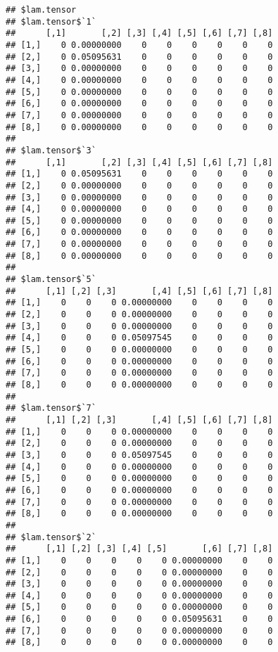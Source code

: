 \documentclass[
]{article}
\begin{document}
\begin{verbatim}
## $lam.tensor
## $lam.tensor$`1`
##      [,1]       [,2] [,3] [,4] [,5] [,6] [,7] [,8]
## [1,]    0 0.00000000    0    0    0    0    0    0
## [2,]    0 0.05095631    0    0    0    0    0    0
## [3,]    0 0.00000000    0    0    0    0    0    0
## [4,]    0 0.00000000    0    0    0    0    0    0
## [5,]    0 0.00000000    0    0    0    0    0    0
## [6,]    0 0.00000000    0    0    0    0    0    0
## [7,]    0 0.00000000    0    0    0    0    0    0
## [8,]    0 0.00000000    0    0    0    0    0    0
## 
## $lam.tensor$`3`
##      [,1]       [,2] [,3] [,4] [,5] [,6] [,7] [,8]
## [1,]    0 0.05095631    0    0    0    0    0    0
## [2,]    0 0.00000000    0    0    0    0    0    0
## [3,]    0 0.00000000    0    0    0    0    0    0
## [4,]    0 0.00000000    0    0    0    0    0    0
## [5,]    0 0.00000000    0    0    0    0    0    0
## [6,]    0 0.00000000    0    0    0    0    0    0
## [7,]    0 0.00000000    0    0    0    0    0    0
## [8,]    0 0.00000000    0    0    0    0    0    0
## 
## $lam.tensor$`5`
##      [,1] [,2] [,3]       [,4] [,5] [,6] [,7] [,8]
## [1,]    0    0    0 0.00000000    0    0    0    0
## [2,]    0    0    0 0.00000000    0    0    0    0
## [3,]    0    0    0 0.00000000    0    0    0    0
## [4,]    0    0    0 0.05097545    0    0    0    0
## [5,]    0    0    0 0.00000000    0    0    0    0
## [6,]    0    0    0 0.00000000    0    0    0    0
## [7,]    0    0    0 0.00000000    0    0    0    0
## [8,]    0    0    0 0.00000000    0    0    0    0
## 
## $lam.tensor$`7`
##      [,1] [,2] [,3]       [,4] [,5] [,6] [,7] [,8]
## [1,]    0    0    0 0.00000000    0    0    0    0
## [2,]    0    0    0 0.00000000    0    0    0    0
## [3,]    0    0    0 0.05097545    0    0    0    0
## [4,]    0    0    0 0.00000000    0    0    0    0
## [5,]    0    0    0 0.00000000    0    0    0    0
## [6,]    0    0    0 0.00000000    0    0    0    0
## [7,]    0    0    0 0.00000000    0    0    0    0
## [8,]    0    0    0 0.00000000    0    0    0    0
## 
## $lam.tensor$`2`
##      [,1] [,2] [,3] [,4] [,5]       [,6] [,7] [,8]
## [1,]    0    0    0    0    0 0.00000000    0    0
## [2,]    0    0    0    0    0 0.00000000    0    0
## [3,]    0    0    0    0    0 0.00000000    0    0
## [4,]    0    0    0    0    0 0.00000000    0    0
## [5,]    0    0    0    0    0 0.00000000    0    0
## [6,]    0    0    0    0    0 0.05095631    0    0
## [7,]    0    0    0    0    0 0.00000000    0    0
## [8,]    0    0    0    0    0 0.00000000    0    0

\end{verbatim}
\end{document}
